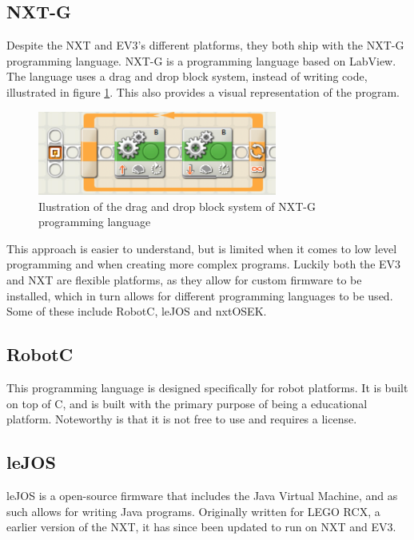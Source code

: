 \subsection*{NXT-G}
Despite the NXT and EV3's different platforms, they both ship with the NXT-G programming language. NXT-G is a programming language based on LabView\cite{LabView}. The language uses a drag and drop block system, instead of writing code, illustrated in figure \ref{NXT-G}. This also provides a visual representation of the program.

\begin{figure}[H]
    \centering
    \includegraphics[width=0.7\textwidth]{Images/Software/Mindstorms/mindstorms_block.png}
    \caption{Ilustration of the drag and drop block system of NXT-G programming language}
    \label{NXT-G}
\end{figure}

This approach is easier to understand, but is limited when it comes to low level programming and when creating more complex programs. Luckily both the EV3 and NXT are flexible platforms, as they allow for custom firmware to be installed, which in turn allows for different programming languages to be used.
Some of these include RobotC\cite{RobotC}, leJOS\cite{leJOS} and nxtOSEK\cite{nxtOSEK}.

\subsection*{RobotC}
This programming language is designed specifically for robot platforms. It is built on top of C, and is built with the primary purpose of being a educational platform. Noteworthy is that it is not free to use and requires a license.

\subsection*{leJOS}
leJOS is a open-source firmware that includes the Java Virtual Machine\cite{Java}, and as such allows for writing Java programs. Originally written for LEGO RCX, a earlier version of the NXT, it has since been updated to run on NXT and EV3.

